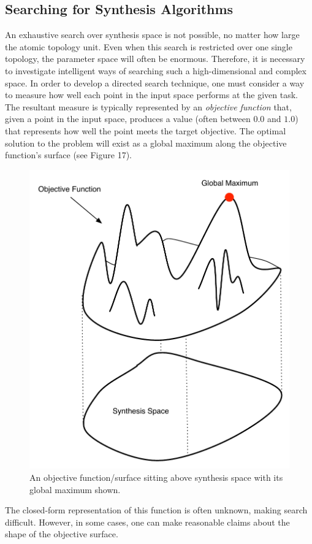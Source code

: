 \documentclass[12pt]{report} 	%
\numberwithin{figure}{chapter}
\numberwithin{table}{chapter}
\numberwithin{equation}{chapter}
\begin{document}
\begin{flushleft}
\subsection{Searching for Synthesis Algorithms}
An exhaustive search over synthesis space is not possible, no matter how large the atomic topology unit. Even when this search is restricted over one single topology, the parameter space will often be enormous. Therefore, it is necessary to investigate intelligent ways of searching such a high-dimensional and complex space. In order to develop a directed search technique, one must consider a way to measure how well each point in the input space performs at the given task. The resultant measure is typically represented by an \textit{objective function} that, given a point in the input space, produces a value (often between $0.0$ and $1.0$) that represents how well the point meets the target objective. The optimal solution to the problem will exist as a global maximum along the objective function's surface (see Figure 17). \begin{figure}[h!]
\begin{center}
\includegraphics[scale=0.7]{FitnessFunction}
\caption[Fitness function]{An objective function/surface sitting above synthesis space with its global maximum shown.}
\end{center}
\end{figure}
The closed-form representation of this function is often unknown, making search difficult. However, in some cases, one can make reasonable claims about the shape of the objective surface.


\end{flushleft}
\end{document}
